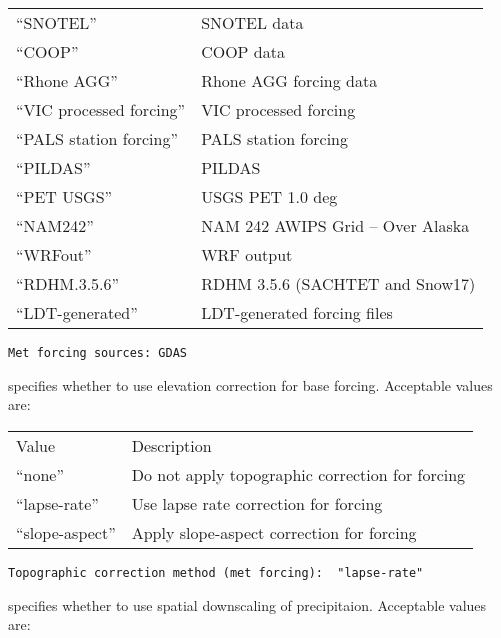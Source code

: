 \begin{tabular}{ll}
 ``SNOTEL''                    & SNOTEL data                        \\
 ``COOP''                      & COOP data                          \\
 ``Rhone AGG''                 & Rhone AGG forcing data             \\
 ``VIC processed forcing''     & VIC processed forcing              \\
 ``PALS station forcing''      & PALS station forcing               \\
 ``PILDAS''                    & PILDAS                             \\
 ``PET USGS''                  & USGS PET 1.0 deg                   \\
 ``NAM242''                    & NAM 242 AWIPS Grid -- Over Alaska  \\
 ``WRFout''                    & WRF output                         \\
 ``RDHM.3.5.6''                & RDHM 3.5.6 (SACHTET and Snow17)    \\
 ``LDT-generated''             & LDT-generated forcing files        \\
 \end{tabular}
 

 \begin{Verbatim}[frame=single]
Met forcing sources: GDAS
 \end{Verbatim}

 
  specifies whether 
 to use elevation correction for base forcing.
 Acceptable values are:

 \begin{tabular}{ll}
 Value          & Description                                       \\
 ``none''         & Do not apply topographic correction for forcing \\
 ``lapse-rate''   & Use lapse rate correction for forcing           \\
 ``slope-aspect'' & Apply slope-aspect correction for forcing       \\
 \end{tabular}
 

 \begin{Verbatim}[frame=single]
Topographic correction method (met forcing):  "lapse-rate"
 \end{Verbatim}

 
  specifies whether
 to use spatial downscaling of precipitaion.
 Acceptable values are:

